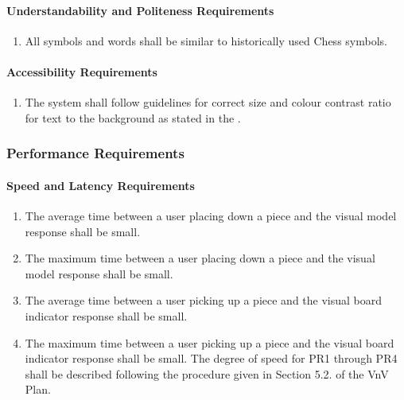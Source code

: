 \documentclass[12pt]{article}
\begin{document}
\paragraph{Understandability and Politeness Requirements}
\begin{enumerate}[{UH}1., leftmargin=2\parindent, resume]
    \item All symbols and words shall be similar to historically used Chess symbols. \cite{ChessHistory2003}
\end{enumerate}

\paragraph{Accessibility Requirements}
\begin{enumerate}[{UH}1., leftmargin=2\parindent, resume]
    \item The system shall follow guidelines for correct size and colour contrast ratio for text to the background as stated in the \cite{WCAG2018}.
\end{enumerate}



\subsubsection{Performance Requirements}
\label{NFR_PR}
\paragraph{Speed and Latency Requirements}
\begin{enumerate}[{PR}1., leftmargin=2\parindent]
    \item The average time between a user placing down a piece and the visual model response shall be small.
    \item The maximum time between a user placing down a piece and the visual model response shall be small.
    \item The average time between a user picking up a piece and the visual board indicator response shall be small.
    \item The maximum time between a user picking up a piece and the visual board indicator response shall be small. 
    The degree of speed for PR1 through PR4 shall be described following the procedure given in Section 5.2.\thevnvSectionNfr{}
    of the VnV Plan.
\end{enumerate}

\end{document}
